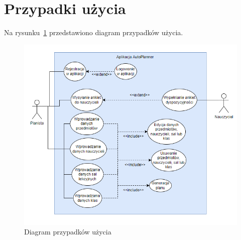 \section{Przypadki użycia}
Na rysunku~\ref{rys:pu} przedstawiono diagram przypadków użycia.
\begin{figure}[!ht]
\centering\includegraphics[width=\textwidth]{figures/DiagramPU}
\caption{Diagram przypadków użycia}\label{rys:pu}
\end{figure}



